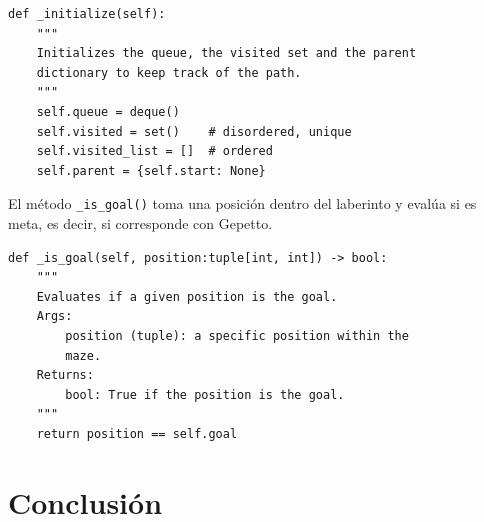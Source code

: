 \documentclass[12pt, letterpaper]{article}
\begin{document}
\begin{lstlisting}
def _initialize(self):
    """
    Initializes the queue, the visited set and the parent
    dictionary to keep track of the path.
    """
    self.queue = deque()
    self.visited = set()    # disordered, unique
    self.visited_list = []  # ordered
    self.parent = {self.start: None}
\end{lstlisting}
El método \lstinline{_is_goal()} toma una posición dentro del laberinto y evalúa si es meta, es decir, si corresponde con Gepetto.\\
\begin{lstlisting}
def _is_goal(self, position:tuple[int, int]) -> bool:
    """
    Evaluates if a given position is the goal.
    Args:
        position (tuple): a specific position within the
        maze.
    Returns:
        bool: True if the position is the goal.
    """
    return position == self.goal
\end{lstlisting}
\clearpage
\section{Conclusión}
\clearpage
\end{document}
